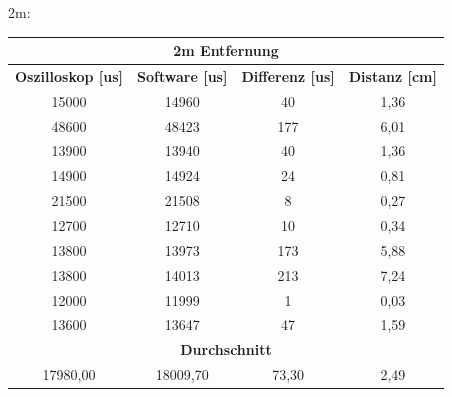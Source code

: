 2m:
\begin{table}[H]
\begin{tabular}{|c|c|c|c|}
\hline
\multicolumn{4}{|c|}{\textbf{2m Entfernung}}                                                                         \\ \hline
\textbf{Oszilloskop {[}us{]}} & \textbf{Software {[}us{]}} & \textbf{Differenz {[}us{]}} & \textbf{Distanz {[}cm{]}} \\ \hline
15000                         & 14960                      & 40                          & 1,36                      \\ \hline
48600                         & 48423                      & 177                         & 6,01                      \\ \hline
13900                         & 13940                      & 40                          & 1,36                      \\ \hline
14900                         & 14924                      & 24                          & 0,81                      \\ \hline
21500                         & 21508                      & 8                           & 0,27                      \\ \hline
12700                         & 12710                      & 10                          & 0,34                      \\ \hline
13800                         & 13973                      & 173                         & 5,88                      \\ \hline
13800                         & 14013                      & 213                         & 7,24                      \\ \hline
12000                         & 11999                      & 1                           & 0,03                      \\ \hline
13600                         & 13647                      & 47                          & 1,59                      \\ \hline
\multicolumn{4}{|c|}{\textbf{Durchschnitt}}                                                                          \\ \hline
17980,00                      & 18009,70                   & 73,30                       & 2,49                      \\ \hline
\end{tabular}
\end{table}

